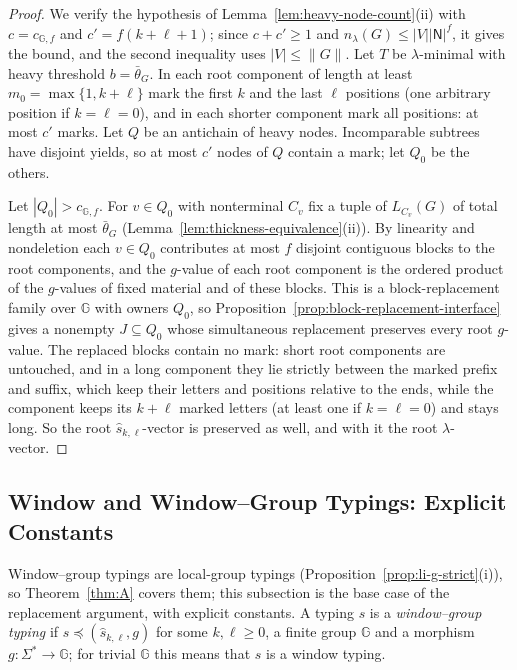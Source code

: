 \documentclass[11pt]{article}
\numberwithin{equation}{section}
\theoremstyle{plain}
\theoremstyle{definition}
\theoremstyle{remark}
\theoremstyle{plain}
\begin{document}
\begin{proof}
We verify the hypothesis of Lemma~\ref{lem:heavy-node-count}(ii) with
$c=c_{{\mathbb G},f}$ and $c'=f(k+\ell+1)$; since $c+c'\ge1$ and $n_\lambda(G)\le|V||\mathsf N|^f$, it gives the
bound, and the second inequality uses $|V|\le\|G\|$.  Let $T$ be $\lambda$-minimal
with heavy threshold $b=\bar\theta_G$.  In
each root component of length at least $m_0=\max\{1,k+\ell\}$ mark the first $k$
and the last $\ell$ positions (one arbitrary position if $k=\ell=0$), and in each
shorter component mark all positions: at most $c'$ marks.  Let $Q$ be an antichain
of heavy nodes.  Incomparable subtrees have disjoint yields, so at most $c'$ nodes
of $Q$ contain a mark; let $Q_0$ be the others.

Let $|Q_0|>c_{{\mathbb G},f}$.  For $v\in Q_0$ with nonterminal $C_v$ fix a tuple of
$L_{C_v}(G)$ of total length at most $\bar\theta_G$
(Lemma~\ref{lem:thickness-equivalence}(ii)).  By linearity and nondeletion each
$v\in Q_0$ contributes at most $f$ disjoint contiguous blocks to the root
components, and the $g$-value of each root component is the ordered product of
the $g$-values of fixed material and of these blocks.  This is a
block-replacement family over ${\mathbb G}$ with owners $Q_0$, so
Proposition~\ref{prop:block-replacement-interface} gives a nonempty
$J\subseteq Q_0$ whose simultaneous replacement preserves every root $g$-value.
The replaced blocks contain no mark: short root components are untouched, and in
a long component they lie strictly between the marked prefix and suffix, which
keep their letters and positions relative to the ends, while the component keeps
its $k+\ell$ marked letters (at least one if $k=\ell=0$) and stays long.  So the
root $\widehat s_{k,\ell}$-vector is preserved as well, and with it the root
$\lambda$-vector.
\end{proof}

\subsection{Window and Window--Group Typings: Explicit Constants}
\label{subsec:boundary-polydata}

Window--group typings are local-group typings
(Proposition~\ref{prop:li-g-strict}(i)), so Theorem~\ref{thm:A} covers them; this
subsection is the base case of the replacement argument, with explicit constants.
A typing $s$ is a \emph{window--group typing} if $\widehat s\preceq(\widehat s_{k,\ell},g)$ for some $k,\ell\ge0$, a
finite group ${\mathbb G}$ and a morphism $g:\Sigma^*\to{\mathbb G}$; for trivial
${\mathbb G}$ this means that $s$ is a window typing.
\end{document}
